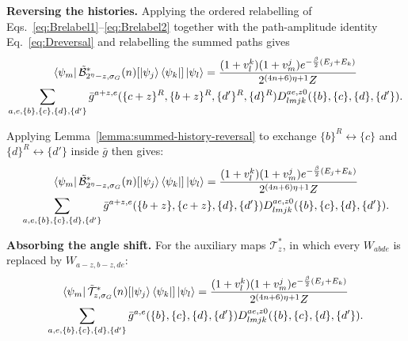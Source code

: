 \documentclass[aps,floatfix,10pt,amssymb,amsfont,amsmath,superscriptaddress,float,nofootinbib,longbibliography,nobalancelastpage,twocolumn]{revtex4-2}
\begin{document}
\smallskip
\noindent\textbf{Reversing the histories.} Applying the ordered relabelling of Eqs.~\eqref{eq:Brelabel1}--\eqref{eq:Brelabel2} together with the path-amplitude identity Eq.~\eqref{eq:Dreversal} and relabelling the summed paths gives
\begin{multline}
     \bra{\psi_m}\tilde{\mathcal{B}}^*_{2^{\eta}-z,\sigma_G}(n)[\ket{\psi_j}\bra{\psi_k}]\ket{\psi_l} = \frac{(1+v_l^k)(1+v_m^j)e^{-\frac{\beta}{2}(E_j+E_k)}}{2^{(4n+6)\eta+1}Z}\\\sum_{a,e,\{b\},\{c\},\{d\},\{d'\}} \bar g^{a+z,e}(\{c+z\}^R,\{b+z\}^R,\{d'\}^R,\{d\}^R) D^{ae,z0}_{lmjk}(\{b\},\{c\},\{d\},\{d'\}).
     \label{eq:relabelline}
\end{multline}

Applying Lemma~\ref{lemma:summed-history-reversal} to exchange $\{b\}^R \leftrightarrow \{c\}$ and $\{d\}^R \leftrightarrow \{d'\}$ inside $\bar g$ then gives:
\begin{multline}
         \bra{\psi_m}\tilde{\mathcal{B}}^*_{2^{\eta}-z,\sigma_G}(n)[\ket{\psi_j}\bra{\psi_k}]\ket{\psi_l} = \frac{(1+v_l^k)(1+v_m^j)e^{-\frac{\beta}{2}(E_j+E_k)}}{2^{(4n+6)\eta+1}Z}\\\sum_{a,e,\{b\},\{c\},\{d\},\{d'\}} \bar g^{a+z,e}(\{b+z\},\{c+z\},\{d\},\{d'\}) D^{ae,z0}_{lmjk}(\{b\},\{c\},\{d\},\{d'\}).
\label{eq:Bsymm}
\end{multline}


\smallskip
\noindent\textbf{Absorbing the angle shift.} For the auxiliary maps $\mathcal{T}^*_z$, in which every $W_{abde}$ is replaced by $W_{a-z,b-z,de}$:
\begin{multline}
         \bra{\psi_m}\tilde{\mathcal{T}}^*_{z,\sigma_G}(n)[\ket{\psi_j}\bra{\psi_k}]\ket{\psi_l} = \frac{(1+v_l^k)(1+v_m^j)e^{-\frac{\beta}{2}(E_j+E_k)}}{2^{(4n+6)\eta+1}Z}\\\sum_{a,e,\{b\},\{c\},\{d\},\{d'\}} \bar g^{a,e}(\{b\},\{c\},\{d\},\{d'\}) D^{ae,z0}_{lmjk}(\{b\},\{c\},\{d\},\{d'\}).
     \label{eq:relabelline-symmetrized}
\end{multline}
\end{document}
